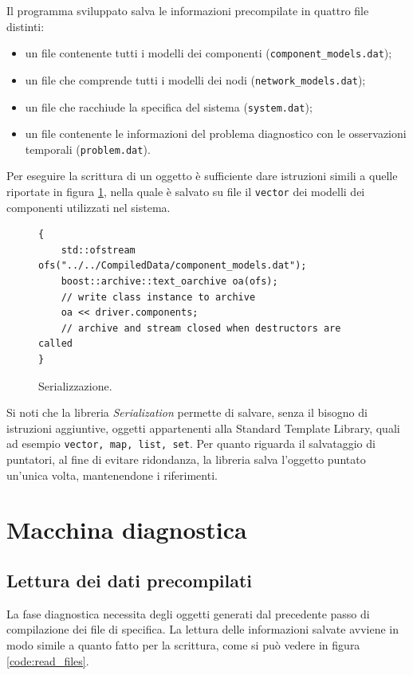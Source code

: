 Il programma sviluppato salva le informazioni precompilate in quattro file distinti:
\begin{itemize}
\item un file contenente tutti i modelli dei componenti (\verb|component_models.dat|);
\item un file che comprende tutti i modelli dei nodi (\verb|network_models.dat|);
\item un file che racchiude la specifica del sistema (\verb|system.dat|);
\item un file contenente le informazioni del problema diagnostico con le osservazioni temporali (\verb|problem.dat|).
\end{itemize}
Per eseguire la scrittura di un oggetto è sufficiente dare istruzioni simili a quelle riportate in figura \ref{code:serialize_main}, nella quale è salvato su file il \verb|vector| dei modelli dei componenti utilizzati nel sistema.

\begin{figure}[htbp]
\begin{verbatim}
{
    std::ofstream ofs("../../CompiledData/component_models.dat");
    boost::archive::text_oarchive oa(ofs);
    // write class instance to archive
    oa << driver.components;
    // archive and stream closed when destructors are called
}
\end{verbatim}
\caption{Serializzazione.}
\label{code:serialize_main}
\end{figure}

Si noti che la libreria \emph{Serialization} permette di salvare, senza il bisogno di istruzioni aggiuntive, oggetti appartenenti alla Standard Template Library, quali ad esempio \verb|vector, map, list, set|. Per quanto riguarda il salvataggio di puntatori, al fine di evitare ridondanza, la libreria salva l'oggetto puntato un'unica volta, mantenendone i riferimenti.


\section{Macchina diagnostica}

\subsection{Lettura dei dati precompilati}
La fase diagnostica necessita degli oggetti generati dal precedente passo di compilazione dei file di specifica. La lettura delle informazioni salvate avviene in modo simile a quanto fatto per la scrittura, come si può vedere in figura \ref{code:read_files}.


